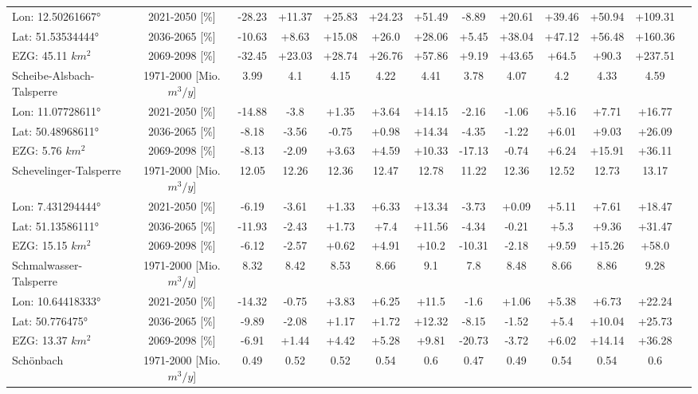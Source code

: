 \begin{longtable}{@{\extracolsep{\fill}}lc|ccccc||cccccc}
\cline{2-13} 
Lon: 12.50261667° & 2021-2050 [\%]  & -28.23 & +11.37 & +25.83 & +24.23 & +51.49 & -8.89 & +20.61 & +39.46 & +50.94 & +109.31 & \\ 
Lat: 51.53534444° & 2036-2065 [\%]  & -10.63 & +8.63 & +15.08 & +26.0 & +28.06 & +5.45 & +38.04 & +47.12 & +56.48 & +160.36 & \\ 
EZG: 45.11 $km^2$ & 2069-2098 [\%]  & -32.45 & +23.03 & +28.74 & +26.76 & +57.86 & +9.19 & +43.65 & +64.5 & +90.3 & +237.51 & \\ 
\hline 
Scheibe-Alsbach-Talsperre & 1971-2000 [Mio. $m^3/y$]  & 3.99 & 4.1 & 4.15 & 4.22 & 4.41 & 3.78 & 4.07 & 4.2 & 4.33 & 4.59 & \\ 
\cline{2-13} 
Lon: 11.07728611° & 2021-2050 [\%]  & -14.88 & -3.8 & +1.35 & +3.64 & +14.15 & -2.16 & -1.06 & +5.16 & +7.71 & +16.77 & \\ 
Lat: 50.48968611° & 2036-2065 [\%]  & -8.18 & -3.56 & -0.75 & +0.98 & +14.34 & -4.35 & -1.22 & +6.01 & +9.03 & +26.09 & \\ 
EZG: 5.76 $km^2$ & 2069-2098 [\%]  & -8.13 & -2.09 & +3.63 & +4.59 & +10.33 & -17.13 & -0.74 & +6.24 & +15.91 & +36.11 & \\ 
\hline 
Schevelinger-Talsperre & 1971-2000 [Mio. $m^3/y$]  & 12.05 & 12.26 & 12.36 & 12.47 & 12.78 & 11.22 & 12.36 & 12.52 & 12.73 & 13.17 & \\ 
\cline{2-13} 
Lon: 7.431294444° & 2021-2050 [\%]  & -6.19 & -3.61 & +1.33 & +6.33 & +13.34 & -3.73 & +0.09 & +5.11 & +7.61 & +18.47 & \\ 
Lat: 51.13586111° & 2036-2065 [\%]  & -11.93 & -2.43 & +1.73 & +7.4 & +11.56 & -4.34 & -0.21 & +5.3 & +9.36 & +31.47 & \\ 
EZG: 15.15 $km^2$ & 2069-2098 [\%]  & -6.12 & -2.57 & +0.62 & +4.91 & +10.2 & -10.31 & -2.18 & +9.59 & +15.26 & +58.0 & \\ 
\hline 
Schmalwasser-Talsperre & 1971-2000 [Mio. $m^3/y$]  & 8.32 & 8.42 & 8.53 & 8.66 & 9.1 & 7.8 & 8.48 & 8.66 & 8.86 & 9.28 & \\ 
\cline{2-13} 
Lon: 10.64418333° & 2021-2050 [\%]  & -14.32 & -0.75 & +3.83 & +6.25 & +11.5 & -1.6 & +1.06 & +5.38 & +6.73 & +22.24 & \\ 
Lat: 50.776475° & 2036-2065 [\%]  & -9.89 & -2.08 & +1.17 & +1.72 & +12.32 & -8.15 & -1.52 & +5.4 & +10.04 & +25.73 & \\ 
EZG: 13.37 $km^2$ & 2069-2098 [\%]  & -6.91 & +1.44 & +4.42 & +5.28 & +9.81 & -20.73 & -3.72 & +6.02 & +14.14 & +36.28 & \\ 
\hline 
Schönbach & 1971-2000 [Mio. $m^3/y$]  & 0.49 & 0.52 & 0.52 & 0.54 & 0.6 & 0.47 & 0.49 & 0.54 & 0.54 & 0.6 & \\ 

\end{longtable}
